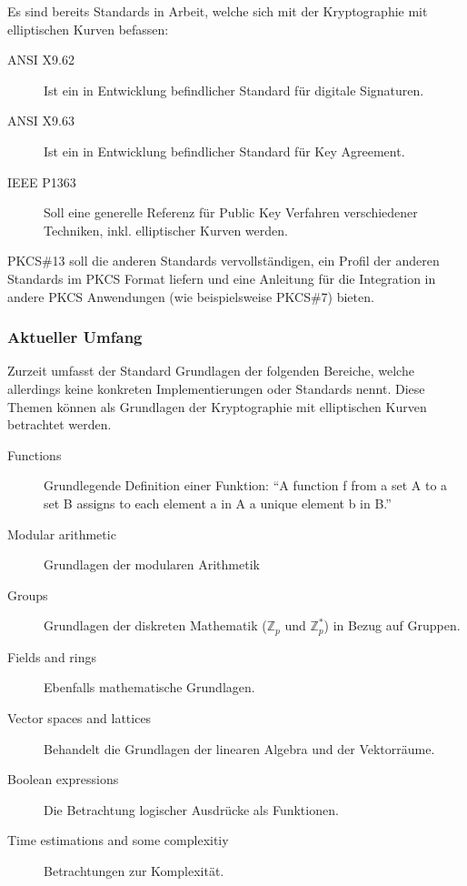 \documentclass[10pt,a4paper]{article}
\begin{document}
Es sind bereits Standards in Arbeit, welche sich mit der Kryptographie mit elliptischen
Kurven befassen:
\begin{description}
    \item[ANSI X9.62] Ist ein in Entwicklung befindlicher Standard für digitale
        Signaturen.
    \item[ANSI X9.63 ] Ist ein in Entwicklung befindlicher Standard für Key Agreement.
    \item[IEEE P1363] Soll eine generelle Referenz für Public Key Verfahren verschiedener
        Techniken, inkl. elliptischer Kurven werden.
\end{description}

PKCS\#13 soll die anderen Standards vervollständigen, ein Profil der anderen Standards im
PKCS Format liefern und eine Anleitung für die Integration in andere PKCS Anwendungen (wie
beispielsweise PKCS\#7) bieten.

\subsubsection{Aktueller Umfang}

Zurzeit umfasst der Standard Grundlagen der folgenden Bereiche, welche allerdings keine
konkreten Implementierungen oder Standards nennt. Diese Themen können als Grundlagen der
Kryptographie mit elliptischen Kurven betrachtet werden.

\begin{description}
    \item[Functions] Grundlegende Definition einer Funktion: "`A function f from a set A
        to a set B assigns to each element a in A a unique element b in
        B."'~\cite{pkcs13-func}
    \item[Modular arithmetic] Grundlagen der modularen Arithmetik
    \item[Groups] Grundlagen der diskreten Mathematik ($\mathbb{Z}_p$ und
        $\mathbb{Z}_p^*$) in Bezug auf Gruppen.
    \item[Fields and rings] Ebenfalls mathematische Grundlagen.
    \item[Vector spaces and lattices] Behandelt die Grundlagen der linearen Algebra und
        der Vektorräume.
    \item[Boolean expressions] Die Betrachtung logischer Ausdrücke als Funktionen.
    \item[Time estimations and some complexitiy] Betrachtungen zur Komplexität.
\end{description}
\end{document}
